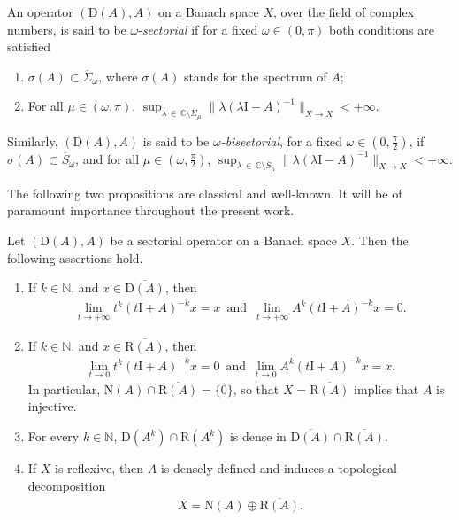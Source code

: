 \documentclass[10pt]{amsart}
\theoremstyle{definition}\newtheorem{defi}[theo]{Definition}\newtheorem{rema}[theo]{Remark}\newtheorem{exam}[theo]{Example}\newtheorem{exem}[theo]{Example}\newtheorem{nota}[theo]{Notation}
\newcommand{\bbC}{\mathbb{C}}
\newcommand{\bbN}{\mathbb{N}}
\newcommand{\rmD}{\mathrm{D}}
\newcommand{\rmR}{\mathrm{R}}
\newcommand{\rmN}{\mathrm{N}}
\newcommand{\rmI}{\mathrm{I}}
\begin{document}
An operator $(\rmD(A),A)$ on a Banach space $X$, over the field of complex numbers, is said to be $\omega$-\emph{sectorial} if for a fixed $\omega\in (0,\pi)$ both conditions are satisfied
\begin{enumerate}
\item $\sigma(A)\subset \overline{\Sigma}_\omega $, where $\sigma(A)$ stands for the spectrum of $A$;
\item For all $\mu\in(\omega,\pi)$, $\sup_{\lambda\,\in\,\bbC\setminus\overline{\Sigma}_\mu}\| \lambda(\lambda \rmI -A)^{-1}\|_{X\rightarrow X} < +\infty$.
\end{enumerate}
Similarly, $(\rmD(A),A)$ is said to be $\omega$\emph{-bisectorial}, for a fixed $\omega\in (0,\frac{\pi}{2})$, if $\sigma(A)\subset \overline{S}_\omega $, and for all $\mu\in(\omega,\frac{\pi}{2})$, $\sup_{\lambda\,\in\,\bbC\setminus\overline{S}_\mu}\| \lambda(\lambda\rmI - A)^{-1}\|_{X\rightarrow X} < +\infty$.

The following two propositions are classical and well-known. It will be of paramount importance throughout the present work.
\begin{prop}\label{prop:SectOpApproxResolv}
Let $(\rmD(A),A)$ be a sectorial operator on a Banach space $X$. Then the following assertions hold.
\begin{enumerate}
\item If $k\in\bbN $, and $x\in\overline{\rmD(A)}$, then
\begin{align*}
\lim_{t\rightarrow +\infty} t^{k}(t\rmI +A)^{-k}x =x \,\text{ and }\, \lim_{t\rightarrow +\infty} A^{k}(t\rmI +A)^{-k}x =0 .
\end{align*}
\item If $k\in\bbN $, and $x\in\overline{\rmR (A)}$, then
\begin{align*}
\lim_{t\rightarrow 0} t^{k}(t\rmI +A)^{-k}x =0 \,\text{ and }\, \lim_{t\rightarrow 0} A^{k}(t\rmI +A)^{-k}x =x .
\end{align*}
In particular, $\rmN (A)\cap\overline{\rmR (A)}=\{ 0 \}$, so that $X=\overline{\rmR (A)}$ implies that $A$ is injective.
\item For every $k\in\bbN $, $\rmD(A^k)\cap{\rmR (A^k)}$ is dense in $\overline{\rmD(A)}\cap\overline{\rmR (A)}$.
\item If $X$ is reflexive, then $A$ is densely defined and induces a topological decomposition
\begin{align*}
X = \rmN (A)\oplus\overline{\rmR (A)}.
\end{align*}
\end{enumerate}
\end{prop}
\end{document}
